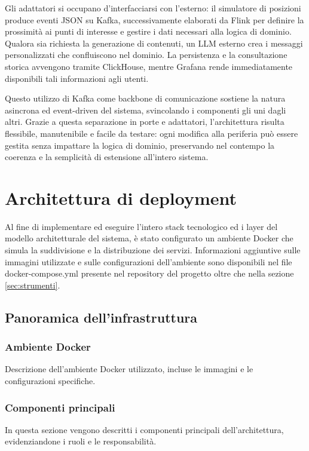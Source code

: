 \documentclass[10pt]{article}
\begin{document}
    Gli adattatori si occupano d'interfacciarsi con l'esterno: il simulatore di posizioni produce eventi JSON su Kafka, successivamente elaborati da Flink per definire la prossimità ai punti di interesse e gestire i dati necessari alla logica di dominio. Qualora sia richiesta la generazione di contenuti, un LLM esterno crea i messaggi personalizzati che confluiscono nel dominio. La persistenza e la consultazione storica avvengono tramite ClickHouse, mentre Grafana rende immediatamente disponibili tali informazioni agli utenti.

    Questo utilizzo di Kafka come backbone di comunicazione sostiene la natura asincrona ed event-driven del sistema, svincolando i componenti gli uni dagli altri. Grazie a questa separazione in porte e adattatori, l'architettura risulta flessibile, manutenibile e facile da testare: ogni modifica alla periferia può essere gestita senza impattare la logica di dominio, preservando nel contempo la coerenza e la semplicità di estensione all'intero sistema.

\section{Architettura di deployment}
Al fine di implementare ed eseguire l'intero stack tecnologico ed i layer del modello architetturale del sistema, è stato configurato un ambiente Docker che simula la suddivisione e la distribuzione dei servizi. Informazioni aggiuntive sulle immagini utilizzate e sulle configurazioni dell'ambiente sono disponibili nel file docker-compose.yml presente nel repository del progetto oltre che nella sezione \ref{sec:strumenti}.
    \subsection{Panoramica dell'infrastruttura}
        \subsubsection{Ambiente Docker}
        Descrizione dell'ambiente Docker utilizzato, incluse le immagini e le configurazioni specifiche.

        \subsubsection{Componenti principali}
        In questa sezione vengono descritti i componenti principali dell'architettura, evidenziandone i ruoli e le responsabilità.
\end{document}
